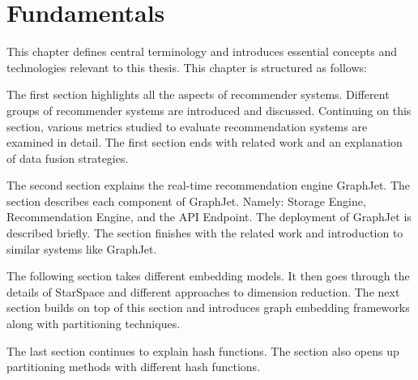 \chapter{Fundamentals}

This chapter defines central terminology and introduces essential concepts and technologies relevant to this thesis. This chapter is structured as follows:

The first section highlights all the aspects of recommender systems. Different groups of recommender systems are introduced and discussed. Continuing on this section, various metrics studied to evaluate recommendation systems are examined in detail. The first section ends with related work and an explanation of data fusion strategies.


The second section explains the real-time recommendation engine GraphJet. The section describes each component of GraphJet. Namely: Storage Engine, Recommendation Engine, and the API Endpoint. The deployment of GraphJet is described briefly. The section finishes with the related work and introduction to similar systems like GraphJet.


The following section takes different embedding models. It then goes through the details of StarSpace and different approaches to dimension reduction. The next section builds on top of this section and introduces graph embedding frameworks along with partitioning techniques.


The last section continues to explain hash functions. The section also opens up partitioning methods with different hash functions.